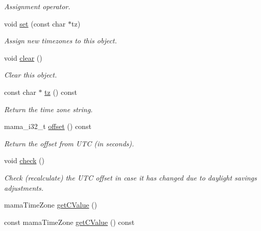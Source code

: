 \begin{DoxyCompactItemize}
\begin{DoxyCompactList}\small\item\em Assignment operator. \item\end{DoxyCompactList}\item 
void \hyperlink{classWombat_1_1MamaTimeZone_a70233754ac2c4450cd5a696d28b4ca64}{set} (const char $\ast$tz)
\begin{DoxyCompactList}\small\item\em Assign new timezones to this object. \item\end{DoxyCompactList}\item 
void \hyperlink{classWombat_1_1MamaTimeZone_af46c9f37ed28148d714a42dc75726072}{clear} ()
\begin{DoxyCompactList}\small\item\em Clear this object. \item\end{DoxyCompactList}\item 
const char $\ast$ \hyperlink{classWombat_1_1MamaTimeZone_ad1beb3c4835e44f14044f48a1cb40d29}{tz} () const 
\begin{DoxyCompactList}\small\item\em Return the time zone string. \item\end{DoxyCompactList}\item 
mama\_\-i32\_\-t \hyperlink{classWombat_1_1MamaTimeZone_a067532a001858bb60fbbc4fabe319ad8}{offset} () const 
\begin{DoxyCompactList}\small\item\em Return the offset from UTC (in seconds). \item\end{DoxyCompactList}\item 
void \hyperlink{classWombat_1_1MamaTimeZone_a1fa15041d8226236ab7350ec0be7c5c2}{check} ()
\begin{DoxyCompactList}\small\item\em Check (recalculate) the UTC offset in case it has changed due to daylight savings adjustments. \item\end{DoxyCompactList}\item 
mamaTimeZone \hyperlink{classWombat_1_1MamaTimeZone_aeb0632d3849ab689b818b14ffd80f2b1}{getCValue} ()
\item 
const mamaTimeZone \hyperlink{classWombat_1_1MamaTimeZone_abcd925e29643428d8816f6df3177480b}{getCValue} () const 
\end{DoxyCompactItemize}
